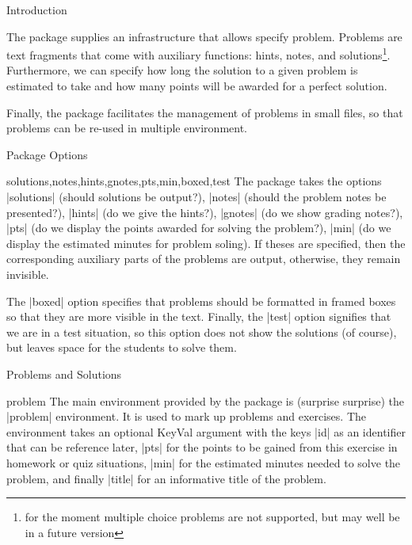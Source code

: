 \begin{sfragment}[id=sec:intro]{Introduction}

The  package supplies an infrastructure that allows specify problem.  Problems
are text fragments that come with auxiliary functions: hints, notes, and
solutions\footnote{for the moment multiple choice problems are not supported, but may
  well be in a future version}. Furthermore, we can specify how long the solution to a
given problem is estimated to take and how many points will be awarded for a perfect
solution.

Finally, the  package facilitates the management of problems in small files,
so that problems can be re-used in multiple environment. 

\begin{sfragment}{Package Options}
  \begin{function}{solutions,notes,hints,gnotes,pts,min,boxed,test}
    The  package takes the options |solutions| (should solutions be output?),
    |notes| (should the problem notes be presented?), |hints| (do we give the hints?),
    |gnotes| (do we show grading notes?), |pts| (do we display the points awarded for
    solving the problem?), |min| (do we display the estimated minutes for problem
    soling). If theses are specified, then the corresponding auxiliary parts of the
    problems are output, otherwise, they remain invisible.

    The |boxed| option specifies that problems should be formatted in framed boxes so that
    they are more visible in the text. Finally, the |test| option signifies that we are in
    a test situation, so this option does not show the solutions (of course), but leaves
    space for the students to solve them.
  \end{function}
\end{sfragment}

\begin{sfragment}[id=sec:user:probsols]{Problems and Solutions}


\begin{environment}{problem}
  The main environment provided by the package is (surprise surprise) the
  |problem| environment. It is used to mark up problems and exercises. The environment
  takes an optional KeyVal argument with the keys |id| as an identifier that can be
  reference later, |pts| for the points to be gained from this exercise in homework or
  quiz situations, |min| for the estimated minutes needed to solve the problem, and
  finally |title| for an informative title of the problem.
\end{environment}


\end{sfragment}
\end{sfragment}
